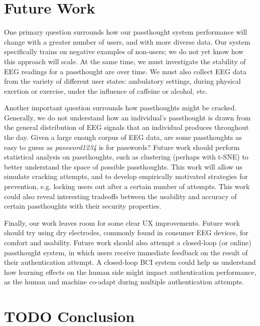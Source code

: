 \documentclass[letterpaper,twocolumn,10pt]{article}
\begin{document}
\section{Future Work}

One primary question surrounds how our passthought system performance will change with a greater number of users, and with more diverse data. Our system specifically trains on negative examples of non-users; we do not yet know how this approach will scale. At the same time, we must investigate the stability of EEG readings for a passthought are over time. We must also collect EEG data from the variety of different user states: ambulatory settings, during physical exertion or exercise, under the influence of caffeine or alcohol, etc.

Another important question surrounds how passthoughts might be cracked.
Generally, we do not understand how an individual's passthought is drawn from the general distribution of EEG signals that an individual produces throughout the day.
Given a large enough corpus of EEG data, are some passthoughts as easy to guess as \textit{password1234} is for passwords?
Future work should perform statistical analysis on passthoughts, such as clustering (perhaps with t-SNE) to better understand the space of possible passthoughts.
This work will allow us simulate cracking attempts, and to develop empirically motivated strategies for prevention, e.g. locking users out after a certain number of attempts.
This work could also reveal interesting tradeoffs between the usability and accuracy of certain passthoughts with their security properties.

Finally, our work leaves room for some clear UX improvements.
Future work should try using dry electrodes, commonly found in consumer EEG devices, for comfort and usability.
Future work should also attempt a closed-loop (or online) passthought system, in which users receive immediate feedback on the result of their authentication attempt. A closed-loop BCI system could help us understand how learning effects
on the human side might impact authentication performance, as the human and machine co-adapt during multiple authentication attempts.

\section{TODO Conclusion}
\end{document}
